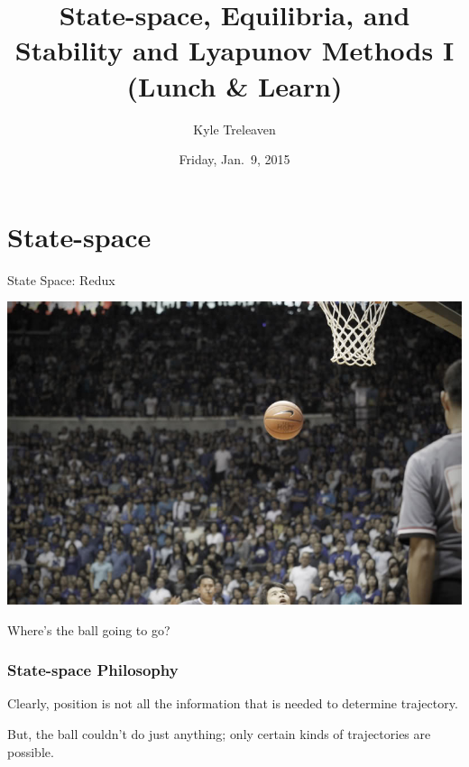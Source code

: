 \documentclass[12pt]{beamer}
\author{Kyle Treleaven}
\title{
State-space, Equilibria, and Stability and Lyapunov Methods I \\
(Lunch \& Learn)
}
\date{Friday, Jan.~9, 2015}
\begin{document}
\begin{frame}
\titlepage

\end{frame}





\section{State-space}


\begin{frame}
\vfill
\centering
{\Large State Space: Redux}
\vfill\null
\end{frame}


\begin{frame}
\centering
\vfill
\includegraphics[width=.6\linewidth]{airball.jpg}

Where's the ball going to go?
\vfill\null
\end{frame}





\begin{frame}
\frametitle{State-space Philosophy}

\begin{itemize}

\vitem Clearly, position is not all the information that is needed to determine trajectory.

\vitem But, the ball couldn't do just anything; only certain kinds of trajectories are possible.

\end{itemize}

\vfill\null
\end{frame}
\end{document}

